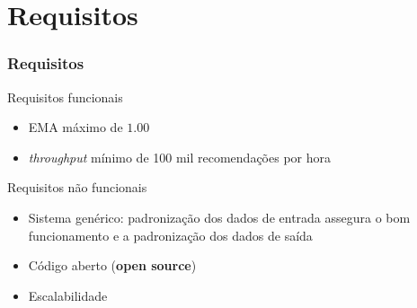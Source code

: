 \section[Requisitos]{Requisitos}
\begin{frame}
\frametitle{Requisitos}
\begin{block}{Requisitos funcionais}
\begin{itemize}
	\item EMA máximo de $1.00$  
	\item \textit{throughput} mínimo de 100 mil recomendações por hora
\end{itemize}
\end{block}

\begin{block}{Requisitos não funcionais}
\begin{itemize}
	\item Sistema genérico: padronização dos dados de entrada assegura o bom funcionamento e a padronização dos dados de saída
	\item Código aberto (\textbf{open source})
	\item Escalabilidade
\end{itemize}
\end{block}
\end{frame}
